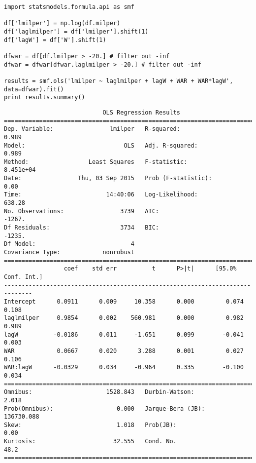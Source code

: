 \documentclass[12pt,fleqn]{article}\usepackage{common}
\begin{document}
\begin{verbatim}
import statsmodels.formula.api as smf

df['lmilper'] = np.log(df.milper)
df['laglmilper'] = df['lmilper'].shift(1)
df['lagW'] = df['W'].shift(1)

dfwar = df[df.lmilper > -20.] # filter out -inf
dfwar = dfwar[dfwar.laglmilper > -20.] # filter out -inf

results = smf.ols('lmilper ~ laglmilper + lagW + WAR + WAR*lagW', data=dfwar).fit()
print results.summary()
\end{verbatim}

\begin{verbatim}
                            OLS Regression Results                            
==============================================================================
Dep. Variable:                lmilper   R-squared:                       0.989
Model:                            OLS   Adj. R-squared:                  0.989
Method:                 Least Squares   F-statistic:                 8.451e+04
Date:                Thu, 03 Sep 2015   Prob (F-statistic):               0.00
Time:                        14:40:06   Log-Likelihood:                 638.28
No. Observations:                3739   AIC:                            -1267.
Df Residuals:                    3734   BIC:                            -1235.
Df Model:                           4                                         
Covariance Type:            nonrobust                                         
==============================================================================
                 coef    std err          t      P>|t|      [95.0% Conf. Int.]
------------------------------------------------------------------------------
Intercept      0.0911      0.009     10.358      0.000         0.074     0.108
laglmilper     0.9854      0.002    560.981      0.000         0.982     0.989
lagW          -0.0186      0.011     -1.651      0.099        -0.041     0.003
WAR            0.0667      0.020      3.288      0.001         0.027     0.106
WAR:lagW      -0.0329      0.034     -0.964      0.335        -0.100     0.034
==============================================================================
Omnibus:                     1528.843   Durbin-Watson:                   2.018
Prob(Omnibus):                  0.000   Jarque-Bera (JB):           136730.088
Skew:                           1.018   Prob(JB):                         0.00
Kurtosis:                      32.555   Cond. No.                         48.2
==============================================================================

\end{verbatim}
\end{document}
